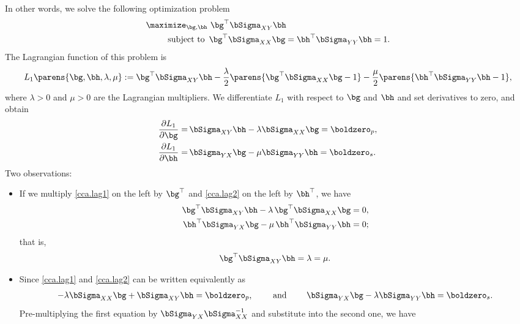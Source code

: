 \documentclass[12pt]{article}
\begin{document}
\begin{enumerate}[label=\textbf{\arabic*.}]
	In other words, we solve the following optimization problem 
	\begin{equation}
		\begin{aligned}
			\maximize_{\bg, \bh} & \ \bg^\top \bSigma_{XY} \bh \\ 
			\text{subject to } & \, \bg^\top \bSigma_{XX} \bg = \bh^\top \bSigma_{YY} \bh = 1. 
		\end{aligned}
	\end{equation}
	The Lagrangian function of this problem is 
	\begin{align}
		L_1 \parens{\bg, \bh, \lambda, \mu} := \bg^\top \bSigma_{XY} \bh - \frac{\lambda}{2}  \parens{\bg^\top \bSigma_{XX} \bg - 1} - \frac{\mu}{2} \parens{\bh^\top \bSigma_{YY} \bh - 1}, 
	\end{align}
	where $\lambda > 0$ and $\mu > 0$ are the Lagrangian multipliers. We differentiate $L_1$ with respect to $\bg$ and $\bh$ and set derivatives to zero, and obtain 
	\begin{align}
		\frac{\partial L_1}{\partial \bg} = & \, \bSigma_{XY} \bh - \lambda \bSigma_{XX} \bg = \boldzero_p, \label{cca.lag1} \\ 
		\frac{\partial L_1}{\partial \bh} = & \, \bSigma_{YX} \bg - \mu \bSigma_{YY} \bh = \boldzero_s. \label{cca.lag2}
	\end{align}
	Two observations: 
	\begin{itemize}
		\item If we multiply \eqref{cca.lag1} on the left by $\bg^\top$ and \eqref{cca.lag2} on the left by $\bh^\top$, we have 
		\begin{align*}
			\bg^\top \bSigma_{XY} \bh - \lambda \, \bg^\top \bSigma_{XX} \bg = 0, \\ 
			\bh^\top \bSigma_{YX} \bg - \mu \, \bh^\top \bSigma_{YY} \bh = 0; 
		\end{align*}
		that is, 
		\begin{align}
			\bg^\top \bSigma_{XY} \bh = \lambda = \mu. 
		\end{align}
		\item Since \eqref{cca.lag1} and \eqref{cca.lag2} can be written equivalently as 
		\begin{align*}
			-\lambda \bSigma_{XX} \bg + \bSigma_{XY} \bh = \boldzero_p, \qquad \text{ and } \qquad \bSigma_{YX} \bg - \lambda \bSigma_{YY} \bh = \boldzero_s. 
		\end{align*}
		Pre-multiplying the first equation by $\bSigma_{YX} \bSigma_{XX}^{-1}$ and substitute into the second one, we have 
		\begin{align}

\end{align}
\end{itemize}
\end{enumerate}
\end{document}
